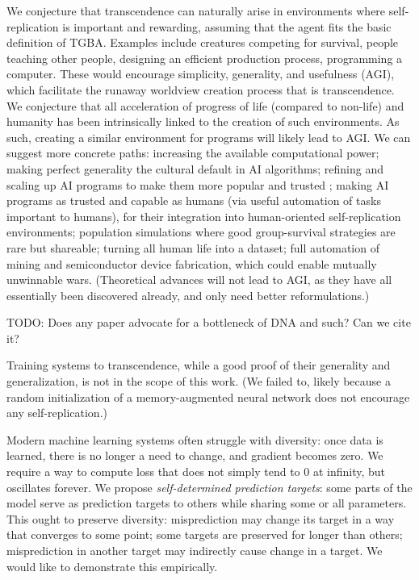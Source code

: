 \documentclass{article}
\begin{document}
We conjecture that transcendence can naturally arise in environments where self-replication is important and rewarding, assuming that the agent fits the basic definition of TGBA. Examples include creatures competing for survival, people teaching other people, designing an efficient production process, programming a computer. These would encourage simplicity, generality, and usefulness (AGI), which facilitate the runaway worldview creation process that is transcendence. We conjecture that all acceleration of progress of life (compared to non-life) and humanity has been intrinsically linked to the creation of such environments. As such, creating a similar environment for programs will likely lead to AGI. We can suggest more concrete paths: increasing the available computational power; making perfect generality the cultural default in AI algorithms; refining and scaling up AI programs to make them more popular and trusted \cite{NEURIPS2020_1457c0d6}; making AI programs as trusted and capable as humans (via useful automation of tasks important to humans), for their integration into human-oriented self-replication environments; population simulations where good group-survival strategies are rare but shareable; turning all human life into a dataset; full automation of mining and semiconductor device fabrication, which could enable mutually unwinnable wars. (Theoretical advances will not lead to AGI, as they have all essentially been discovered already, and only need better reformulations.)

    TODO: Does any paper advocate for a bottleneck of DNA and such? Can we cite it?

Training systems to transcendence, while a good proof of their generality and generalization, is not in the scope of this work. (We failed to, likely because a random initialization of a memory-augmented neural network does not encourage any self-replication.)

Modern machine learning systems often struggle with diversity: once data is learned, there is no longer a need to change, and gradient becomes zero. We require a way to compute loss that does not simply tend to $0$ at infinity, but oscillates forever. We propose \textit{self-determined prediction targets}: some parts of the model serve as prediction targets to others while sharing some or all parameters. This ought to preserve diversity: misprediction may change its target in a way that converges to some point; some targets are preserved for longer than others; misprediction in another target may indirectly cause change in a target. We would like to demonstrate this empirically.
\end{document}
